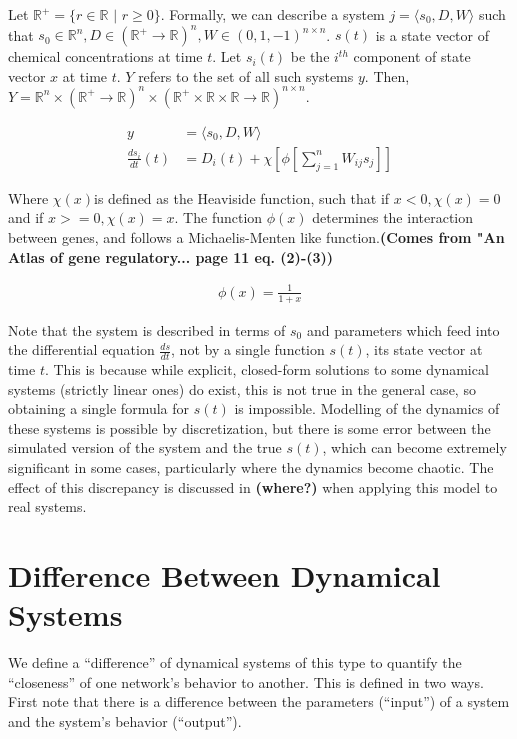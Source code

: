 \documentclass{article}
\begin{document}
Let $\mathbb{R}^+ = \{r \in \mathbb{R} \,\,|\,\, r \ge 0\}$. Formally, we can describe a system $j = \langle s_0, D, W \rangle$ such that $s_0 \in \mathbb{R}^n, D \in (\mathbb{R}^+ \to \mathbb{R})^n, W \in ({0,1,-1})^{n \times n}$. $s(t)$ is a state vector of chemical concentrations at time $t$. Let $s_i(t)$ be the $i^{th}$ component of state vector $x$ at time $t$. $Y$ refers to the set of all such systems $y$. Then, $Y = \mathbb{R}^n \times (\mathbb{R}^+ \to \mathbb{R})^n \times (\mathbb{R}^+ \times \mathbb{R} \times \mathbb{R} \to \mathbb{R})^{n \times n}$.

\begin{align}
  y &= \langle s_0, D, W \rangle \label{system-defn} \\
  \frac{ds_i}{dt}(t) &= D_i(t) + \chi[\phi[\sum_{j = 1}^n W_{ij}s_{j}]] \label{system-diffeq}
\end{align}

Where $\chi(x)$is defined as the Heaviside function, such that if $x<0 , \chi(x) = 0$ and if $x>= 0, \chi(x)=x$. The function $\phi(x)$ determines the interaction between genes, and follows a  Michaelis-Menten like function.\textbf{(Comes from "An Atlas of gene regulatory... page 11 eq. (2)-(3))} 

\begin{align}
\phi(x) = \frac{1}{1+x}
\end{align}


Note that the system is described in terms of $s_0$ and parameters which feed into the differential equation $\frac{ds}{dt}$, not by a single function $s(t)$, its state vector at time $t$. This is because while explicit, closed-form solutions to some dynamical systems (strictly linear ones) do exist, this is not true in the general case, so obtaining a single formula for $s(t)$ is impossible. Modelling of the dynamics of these systems is possible by discretization, but there is some error between the simulated version of the system and the true $s(t)$, which can become extremely significant in some cases, particularly where the dynamics become chaotic. The effect of this discrepancy is discussed in \textbf{(where?)} when applying this model to real systems.

\section{Difference Between Dynamical Systems} \label{similarity}
We define a ``difference'' of dynamical systems of this type to quantify the ``closeness'' of one network's behavior to another. This is defined in two ways. First note that there is a difference between the parameters (``input'') of a system and the system's behavior (``output'').
\end{document}
